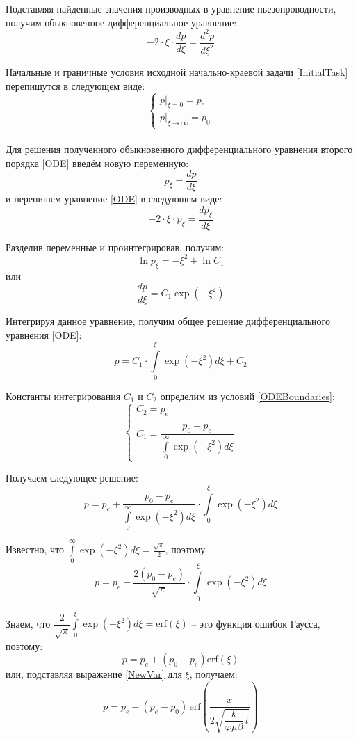 \documentclass[a4paper,14pt]{extarticle}
\newcommand{\beq}{\begin{equation}}
\newcommand{\eeq}{\end{equation}}
\begin{document}
Подставляя найденные значения производных в уравнение пьезопроводности, получим обыкновенное дифференциальное уравнение:
\beq\label{ODE}
-2\cdot\xi\cdot\frac{dp}{d\xi}=\frac{d^2p}{d\xi^2}
\eeq

Начальные и граничные условия исходной начально-краевой задачи \eqref{InitialTask} перепишутся в следующем виде:
\beq\label{ODEBoundaries}
\begin{cases}
p|_{\xi=0}=p_e\\
p|_{\xi\rightarrow\infty}=p_0
\end{cases}
\eeq
\ \\

Для решения полученного обыкновенного дифференциального уравнения второго порядка \eqref{ODE} введём новую переменную:
\beq
p_\xi=\frac{dp}{d\xi}
\eeq
и перепишем уравнение \eqref{ODE} в следующем виде:
\beq
-2\cdot\xi\cdot p_\xi=\frac{dp_\xi}{d\xi}
\eeq

Разделив переменные и проинтегрировав, получим:
\beq
\ln{p_\xi}=-\xi^2+\ln{C_1}
\eeq
или
\beq
\frac{dp}{d\xi}=C_1\exp\left(-\xi^2\right)
\eeq

Интегрируя данное уравнение, получим общее решение дифференциального уравнения \eqref{ODE}:
\beq
p=C_1\cdot\int\limits_{0}^{\xi}\exp{\left(-\xi^2\right)d\xi}+C_2
\eeq

Константы интегрирования $C_1$ и  $C_2$ определим из условий \eqref{ODEBoundaries}:
\beq
\begin{cases}
C_2=p_e\\\\
C_1=\dfrac{p_0-p_e}{\int\limits_{0}^{\infty}{\exp{\left(-\xi^2\right)d\xi}}}
\end{cases}
\eeq

Получаем следующее решение:
\beq
p=p_e+\dfrac{p_0-p_e}{\int\limits_{0}^{\infty}{\exp{\left(-\xi^2\right)d\xi}}}\cdot\int\limits_{0}^{\xi}\exp{\left(-\xi^2\right)d\xi}
\eeq

Известно, что $\displaystyle{}\int\limits_{0}^{\infty}{\exp{\left(-\xi^2\right)d\xi}}=\frac{\sqrt{\pi}}{2}$, поэтому
\beq
p=p_e+\frac{2\left(p_0-p_e\right)}{\sqrt{\pi}}\cdot\int\limits_{0}^{\xi}\exp{\left(-\xi^2\right)d\xi}
\eeq

Знаем, что $\displaystyle{}\dfrac{2}{\sqrt{\pi}}\int\limits_{0}^{\xi}\exp{\left(-\xi^2\right)}d\xi=\text{erf}\left(\xi\right)$ -- это функция ошибок Гаусса, поэтому:
\beq
p=p_e+\left(p_0-p_e\right)\text{erf}\left(\xi\right)
\eeq
или, подставляя выражение \eqref{NewVar} для $\xi$, получаем:
\beq
p=p_e-\left(p_e-p_0\right)\,\text{erf}\!\left(\dfrac{x}{2\sqrt{\dfrac{k}{\varphi\mu\beta}\,t}}\right)
\eeq
\end{document}
